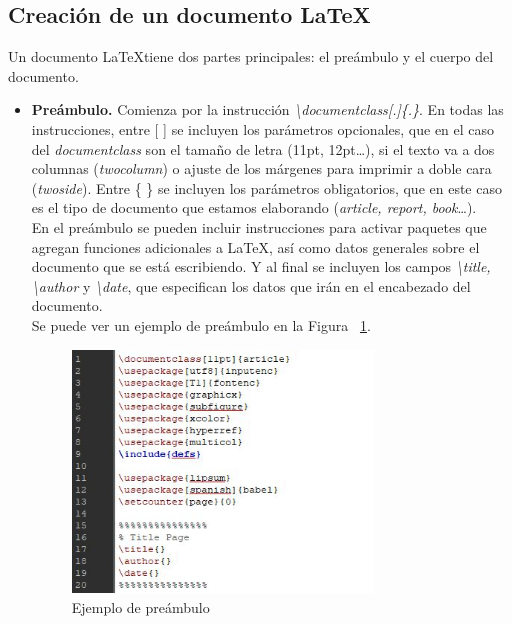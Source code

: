 \documentclass[a4paper, 12pt]{book}
\begin{document}
\subsection{Creación de un documento \LaTeX}
\label{crearLatex}
Un documento \LaTeX tiene dos partes principales: el preámbulo y el cuerpo del documento.
\begin{itemize}
	\item \textbf{Preámbulo.} Comienza por la instrucción \textit{\textbackslash documentclass[.]\{.\}}. En todas las instrucciones, entre [ ] se incluyen los parámetros opcionales, que en el caso del \textit{documentclass} son el tamaño de letra (11pt, 12pt\ldots), si el texto va a dos columnas (\textit{twocolumn}) o ajuste de los márgenes para imprimir a doble cara (\textit{twoside}). Entre \{ \} se incluyen los parámetros obligatorios, que en este caso es el tipo de documento que estamos elaborando (\textit{article, report, book}\ldots).\\
	En el preámbulo se pueden incluir instrucciones para activar paquetes que agregan funciones adicionales a \LaTeX, así como datos generales sobre el documento que se está escribiendo. Y al final se incluyen los campos \textit{\textbackslash title, \textbackslash author} y \textit{\textbackslash date}, que especifican los datos que irán en el encabezado del documento.\\
Se puede ver un ejemplo de preámbulo en la Figura ~\ref{fig:preambulo}.
	\begin{figure}[h!]
		\centering
		\includegraphics[width=8cm, keepaspectratio]{img/preambulo_latex}
		\caption{Ejemplo de preámbulo}
		\label{fig:preambulo}
	\end{figure}
	

\end{itemize}
\end{document}
